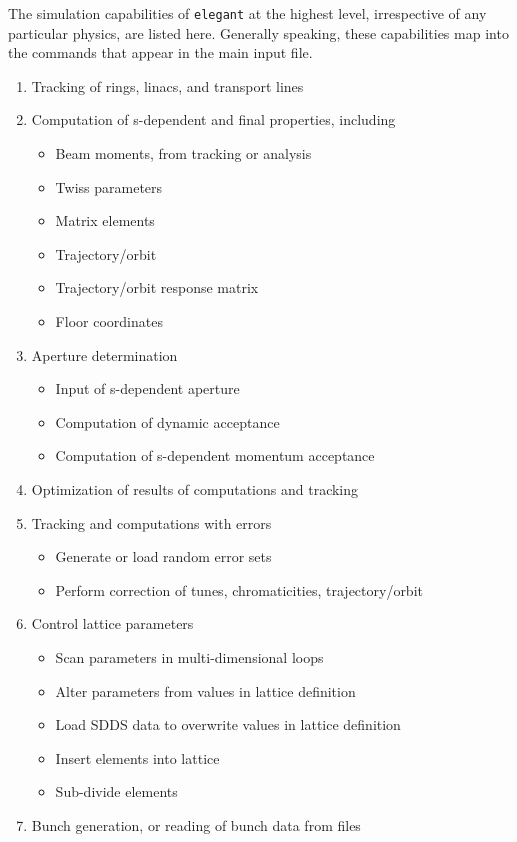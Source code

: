 \documentclass[11pt]{article}
\begin{document}
The simulation capabilities of {\tt elegant} at the highest level, irrespective of any particular physics, are
listed here.  Generally speaking, these capabilities map into the commands that appear in the main input file.
\begin{enumerate}
\item Tracking of rings, linacs, and transport lines
\item Computation of s-dependent and final properties, including
  \begin{itemize}
  \item Beam moments, from tracking or analysis
  \item Twiss parameters
  \item Matrix elements 
  \item Trajectory/orbit
  \item Trajectory/orbit response matrix
  \item Floor coordinates
  \end{itemize}
\item Aperture determination
  \begin{itemize}
  \item Input of s-dependent aperture
  \item Computation of dynamic acceptance
  \item Computation of s-dependent momentum acceptance
  \end{itemize}
\item Optimization of results of computations and tracking
\item Tracking and computations with errors
  \begin{itemize}
  \item Generate or load random error sets
  \item Perform correction of tunes, chromaticities, trajectory/orbit
  \end{itemize}
\item Control lattice parameters
  \begin{itemize}
  \item Scan parameters in multi-dimensional loops
  \item Alter parameters from values in lattice definition
  \item Load SDDS data to overwrite values in lattice definition
  \item Insert elements into lattice
  \item Sub-divide elements
  \end{itemize}
\item Bunch generation, or reading of bunch data from files

\end{enumerate}
\end{document}
